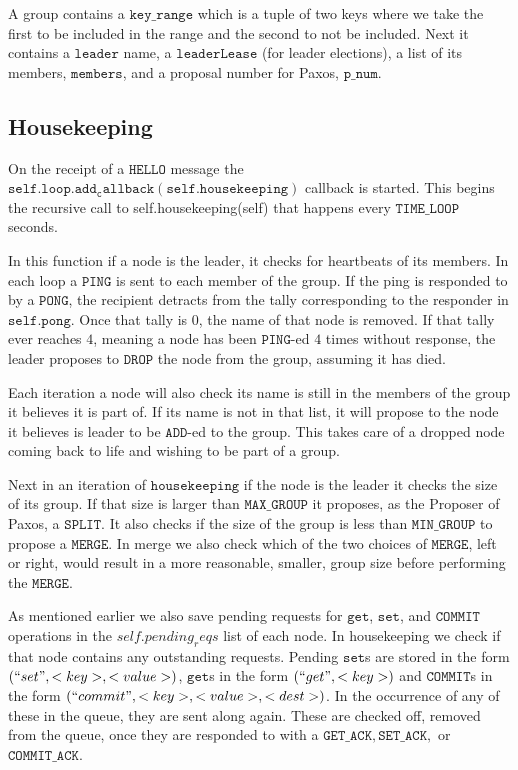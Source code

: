 \documentclass{amsart}
\theoremstyle{definition}
\theoremstyle{remark}
\numberwithin{equation}{section}
\begin{document}
A group contains a $\mathtt{key\_range}$ which is a tuple of two keys where we take the first to be included in the range and the second to not be included. Next it contains a $\mathtt{leader}$ name, a $\mathtt{leaderLease}$ (for leader elections), a list of its members, $\mathtt{members}$, and a proposal number for Paxos, $\mathtt{p\_num}$.
\subsection{Housekeeping}
On the receipt of a $\mathtt{HELLO}$ message the $\mathtt{self.loop.add_callback(self.housekeeping)}$ callback is started. This begins the recursive call to 
self.housekeeping(self) that happens every $\mathtt{TIME\_LOOP}$ seconds. 

In this function if a node is the leader, it checks for heartbeats of its members. In each loop a $\mathtt{PING}$ is sent to each member of the group. If the ping is responded to by a $\mathtt{PONG}$, the recipient detracts from the tally corresponding to the responder in $\mathtt{self.pong}$. Once that tally is $0$, the name of that node is removed. If that tally ever reaches $4$, meaning a node has been $\mathtt{PING}$-ed $4$ times without response, the leader proposes to $\mathtt{DROP}$ the node from the group, assuming it has died.

Each iteration a node will also check its name is still in the members of the group it believes it is part of. If its name is not in that list, it will propose to the node it believes is leader to be $\mathtt{ADD}$-ed to the group. This takes care of a dropped node coming back to life and wishing to be part of a group.

Next in an iteration of $\mathtt{housekeeping}$ if the node is the leader it checks the size of its group. If that size is larger than $\mathtt{MAX\_GROUP}$ it proposes, as the Proposer of Paxos, a $\mathtt{SPLIT}$. It also checks if the size of the group is less than $\mathtt{MIN\_GROUP}$ to propose a $\mathtt{MERGE}$. In merge we also check which of the two choices of $\mathtt{MERGE}$, left or right, would result in a more reasonable, smaller, group size before performing the $\mathtt{MERGE}$.

As mentioned earlier we also save pending requests for $\mathtt{get}$, $\mathtt{set}$, and $\mathtt{COMMIT}$ operations in the $self.pending_reqs$ list of each node. In housekeeping we check if that node contains any outstanding requests. Pending $\mathtt{set}$s are stored in the form $(``set", <key>, <value>)$, $\mathtt{get}$s in the form $(``get", <key>)$ and $\mathtt{COMMIT}$s in the form $(``commit", <key>, <value>, <dest>)$. In the occurrence of any of these in the queue, they are sent along again. These are checked off, removed from the queue, once they are responded to with a $\mathtt{GET\_ACK}, \mathtt{SET\_ACK},$ or $\mathtt{COMMIT\_ACK}$.
\end{document}
